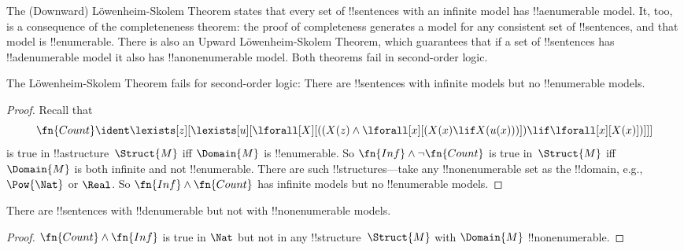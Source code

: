 \documentclass[../../../include/open-logic-section]{subfiles}
\begin{document}


\begin{explain}
The (Downward) L\"owenheim-Skolem Theorem states that every set of
!!{sentence}s with an infinite model has !!a{enumerable} model.  It,
too, is a consequence of the completeneness theorem: the proof of
completeness generates a model for any consistent set of
!!{sentence}s, and that model is !!{enumerable}.  There is also an
Upward L\"owenheim-Skolem Theorem, which guarantees that if a set of
!!{sentence}s has !!a{denumerable} model it also has
!!a{nonenumerable} model.  Both theorems fail in second-order logic.
\end{explain}


\begin{thm}
 The L\"owenheim-Skolem Theorem fails for
second-order logic: There are !!{sentence}s with infinite models but
no !!{enumerable} models.
\end{thm}

\begin{proof}
Recall that 
\[
\fn{Count} \ident \lexists[z][\lexists[u][\lforall[X][((X(z) \land
      \lforall[x][(X(x) \lif X(u(x)))]) \lif \lforall[x][X(x)])]]]
\]
is true in !!a{structure}~$\Struct{M}$ iff $\Domain{M}$ is
!!{enumerable}. So $\fn{Inf} \land \lnot\fn{Count}$ is true in~$\Struct{M}$
iff $\Domain{M}$ is both infinite and not !!{enumerable}.  There are
such !!{structure}s---take any !!{nonenumerable} set as the
!!{domain}, e.g., $\Pow{\Nat}$ or $\Real$. So $\fn{Inf} \land
\fn{Count}$ has infinite models but no !!{enumerable} models.
\end{proof}

\begin{thm}
There are !!{sentence}s with !!{denumerable} but not with
!!{nonenumerable} models.
\end{thm}

\begin{proof}
$\fn{Count} \land \fn{Inf}$ is true in $\Nat$ but not in any
  !!{structure}~$\Struct{M}$ with $\Domain{M}$ !!{nonenumerable}.
\end{proof}
\end{document}
